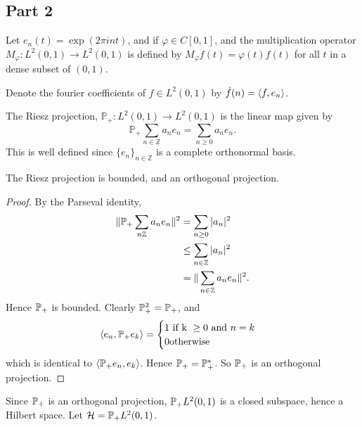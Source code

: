 \documentclass{unswmaths}
\begin{document}
\subsection*{Part 2}
\begin{definition}
    Let $e_n(t) = \exp(2\pi i n t)$, and if $\varphi \in C[0,1]$,
    and the multiplication operator $M_\varphi:L^2(0,1)\rightarrow L^2(0,1)$ is defined by $M_\varphi f(t) = \varphi(t)f(t)$
    for all $t$ in a dense subset of $(0,1)$.    
    
    Denote the fourier coefficients of $f \in L^2(0,1)$ by $\hat{f}(n) = \langle f,e_n\rangle$.
\end{definition}
\begin{definition}
    The Riesz projection, $\mathbb{P}_+:L^2(0,1)\rightarrow L^2(0,1)$ is the linear map given by
    \begin{equation*}
        \mathbb{P}_+\sum_{n\in\mathbb{Z}} a_ne_n = \sum_{n\geq 0} a_ne_n.
    \end{equation*}
    This is well defined since $\{e_n\}_{n\in \mathbb{Z}}$ is a complete orthonormal basis.
\end{definition}
\begin{lemma}
    The Riesz projection is bounded, and an orthogonal projection.
\end{lemma}
\begin{proof}
    By the Parseval identity,
    \begin{align*}
        \| \mathbb{P}_+ \sum_{n\mathbb{Z}} a_n e_n\|^2 &= \sum_{n\geq 0} |a_n|^2\\
        &\leq \sum_{n\in\mathbb{Z}}|a_n|^2\\
        &= \|\sum_{n\in\mathbb{Z}} a_ne_n\|^2.
    \end{align*}
    Hence $\mathbb{P}_+$ is bounded.
    Clearly $\mathbb{P}_+^2 = \mathbb{P}_+$, and 
    \begin{equation*}
        \langle e_n,\mathbb{P}_+ e_k\rangle = \begin{cases}
            1\text{ if k }\geq 0\text{ and }n = k\\
            0\text{otherwise}
        \end{cases}
    \end{equation*}
    which is identical to $\langle\mathbb{P}_+ e_n,e_k\rangle$. Hence $\mathbb{P}_+ = \mathbb{P}_+^*$.    
    So $\mathbb{P}_+$ is an orthogonal projection.
\end{proof}
\begin{definition}
    Since $\mathbb{P}_+$ is an orthogonal projection, $\mathbb{P}_+ L^2(0,1)$ is a closed
    subspace, hence a Hilbert space. Let $\mathcal{H} = \mathbb{P}_+ L^2(0,1)$. 
\end{definition}
\end{document}
